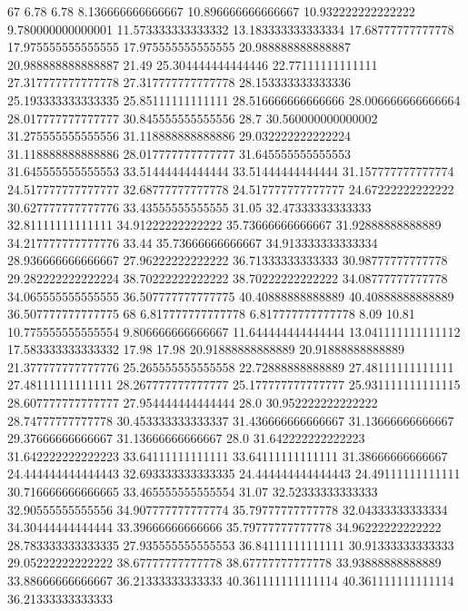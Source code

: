 67 6.78 6.78 8.136666666666667 10.896666666666667 10.932222222222222 9.780000000000001 11.573333333333332 13.183333333333334 17.68777777777778 17.975555555555555 17.975555555555555 20.988888888888887 20.988888888888887 21.49 25.304444444444446 22.77111111111111 27.317777777777778 27.317777777777778 28.153333333333336 25.193333333333335 25.85111111111111 28.516666666666666 28.006666666666664 28.017777777777777 30.845555555555556 28.7 30.560000000000002 31.275555555555556 31.118888888888886 29.032222222222224 31.118888888888886 28.017777777777777 31.645555555555553 31.645555555555553 33.51444444444444 33.51444444444444 31.157777777777774 24.517777777777777 32.68777777777778 24.517777777777777 24.67222222222222 30.627777777777776 33.43555555555555 31.05 32.47333333333333 32.81111111111111 34.91222222222222 35.73666666666667 31.92888888888889 34.217777777777776 33.44 35.73666666666667 34.913333333333334 28.936666666666667 27.96222222222222 36.71333333333333 30.98777777777778 29.282222222222224 38.70222222222222 38.70222222222222 34.08777777777778 34.065555555555555 36.507777777777775 40.40888888888889 40.40888888888889 36.507777777777775
68 6.817777777777778 6.817777777777778 8.09 10.81 10.775555555555554 9.806666666666667 11.644444444444444 13.041111111111112 17.583333333333332 17.98 17.98 20.91888888888889 20.91888888888889 21.377777777777776 25.265555555555558 22.72888888888889 27.48111111111111 27.48111111111111 28.267777777777777 25.177777777777777 25.931111111111115 28.607777777777777 27.954444444444444 28.0 30.952222222222222 28.74777777777778 30.453333333333337 31.436666666666667 31.13666666666667 29.37666666666667 31.13666666666667 28.0 31.642222222222223 31.642222222222223 33.64111111111111 33.64111111111111 31.38666666666667 24.444444444444443 32.693333333333335 24.444444444444443 24.49111111111111 30.716666666666665 33.465555555555554 31.07 32.52333333333333 32.90555555555556 34.907777777777774 35.79777777777778 32.04333333333334 34.30444444444444 33.39666666666666 35.79777777777778 34.96222222222222 28.783333333333335 27.935555555555553 36.84111111111111 30.91333333333333 29.05222222222222 38.67777777777778 38.67777777777778 33.93888888888889 33.88666666666667 36.21333333333333 40.361111111111114 40.361111111111114 36.21333333333333
